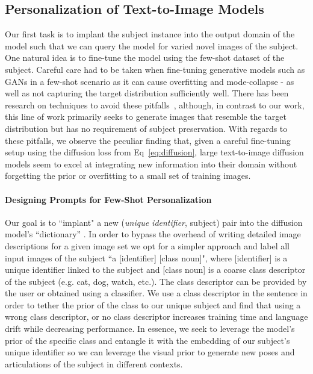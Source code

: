 \subsection{Personalization of Text-to-Image Models}
\label{sec:finetune}



Our first task is to implant the subject instance into the output domain of the model such that we can query the model for varied novel images of the subject. One natural idea is to fine-tune the model using the few-shot dataset of the subject. Careful care had to be taken when fine-tuning generative models such as GANs in a few-shot scenario as it can cause overfitting and mode-collapse - as well as not capturing the target distribution sufficiently well. There has been research on techniques to avoid these pitfalls~\cite{Robb2020FewShotAO,ojha2021few,li2020few,mo2020freeze,Wang_2020_CVPR}, although, in contrast to our work, this line of work primarily seeks to generate images that resemble the target distribution but has no requirement of subject preservation. With regards to these pitfalls, we observe the peculiar finding that, given a careful fine-tuning setup using the diffusion loss from Eq~\ref{eq:diffusion}, large text-to-image diffusion models seem to excel at integrating new information into their domain without forgetting the prior or overfitting to a small set of training images. 

\paragraph{Designing Prompts for Few-Shot Personalization}
Our goal is to ``implant" a new (\textit{unique identifier}, subject) pair into the diffusion model's ``dictionary'' .
In order to bypass the overhead of writing detailed image descriptions for a given image set we opt for a simpler approach and label all input images of the subject ``a [identifier] [class noun]", where [identifier] is a unique identifier linked to the subject and [class noun] is a coarse class descriptor of the subject (e.g. cat, dog, watch, etc.). The class descriptor can be provided by the user or obtained using a classifier. We use a class descriptor in the sentence in order to tether the prior of the class to our unique subject and find that using a wrong class descriptor, or no class descriptor increases training time and language drift while decreasing performance. In essence, we seek to leverage the model's prior of the specific class and entangle it with the embedding of our subject's unique identifier so we can leverage the visual prior to generate new poses and articulations of the subject in different contexts.


